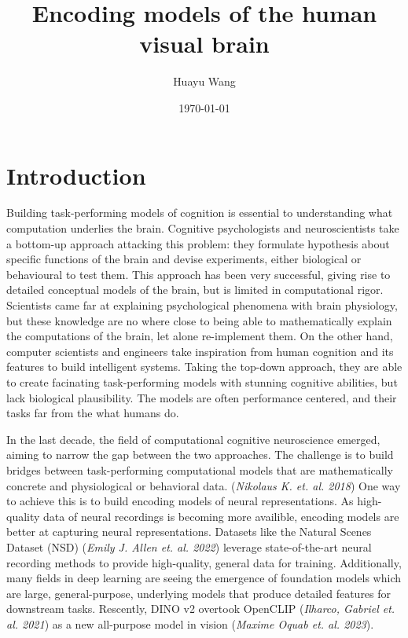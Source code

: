\documentclass[11pt]{article}
\author{Huayu Wang}
\date{\today}
\title{Encoding models of the human visual brain}
\begin{document}
\maketitle
\tableofcontents



\section{Introduction}
\label{sec:org9b48c5e}
Building task-performing models of cognition is essential to understanding what computation underlies the brain. Cognitive psychologists and neuroscientists take a bottom-up approach attacking this problem: they formulate hypothesis about specific functions of the brain and devise experiments, either biological or behavioural to test them. This approach has been very successful, giving rise to detailed conceptual models of the brain, but is limited in computational rigor. Scientists came far at explaining psychological phenomena with brain physiology, but these knowledge are no where close to being able to mathematically explain the computations of the brain, let alone re-implement them. On the other hand, computer scientists and engineers take inspiration from human cognition and its features to build intelligent systems. Taking the top-down approach, they are able to create facinating task-performing models with stunning cognitive abilities, but lack biological plausibility. The models are often performance centered, and their tasks far from the what humans do.

In the last decade, the field of computational cognitive neuroscience emerged, aiming to narrow the gap between the two approaches. The challenge is to build bridges between task-performing computational models that are mathematically concrete and physiological or behavioral data. (\emph{Nikolaus K. et. al. 2018}) One way to achieve this is to build encoding models of neural representations. As high-quality data of neural recordings is becoming more availible, encoding models are better at capturing neural representations. Datasets like the Natural Scenes Dataset (NSD) (\emph{Emily J. Allen et. al. 2022}) leverage state-of-the-art neural recording methods to provide high-quality, general data for training. Additionally, many fields in deep learning are seeing the emergence of foundation models which are large, general-purpose, underlying models that produce detailed features for downstream tasks. Rescently, DINO v2 overtook OpenCLIP (\emph{Ilharco, Gabriel et. al. 2021}) as a new all-purpose model in vision (\emph{Maxime Oquab et. al. 2023}).
\end{document}
